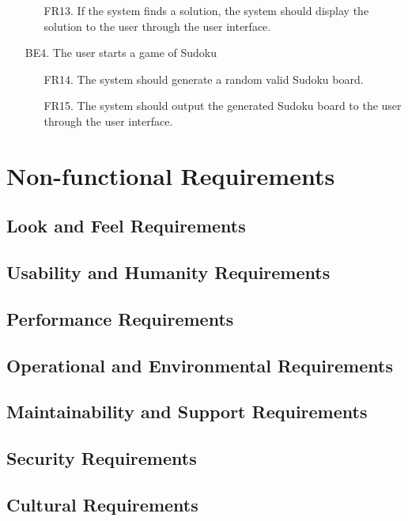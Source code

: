 \documentclass[11pt]{article}
\begin{document}
\begin{enumerate}
\begin{enumerate}
        \item [FR13.] If the system finds a solution, the system should display the solution to the user through the user interface.
    \end{enumerate}
    \item [BE4.] The user starts a game of Sudoku
    \begin{enumerate}
        \item [FR14.] The system should generate a random valid Sudoku board.
        \item [FR15.] The system should output the generated Sudoku board to the user through the user interface.
    \end{enumerate}
\end{enumerate}

\section{Non-functional Requirements}

\subsection{Look and Feel Requirements}

\subsection{Usability and Humanity Requirements}

\subsection{Performance Requirements}

\subsection{Operational and Environmental Requirements}

\subsection{Maintainability and Support Requirements}

\subsection{Security Requirements}

\subsection{Cultural Requirements}
\end{document}
